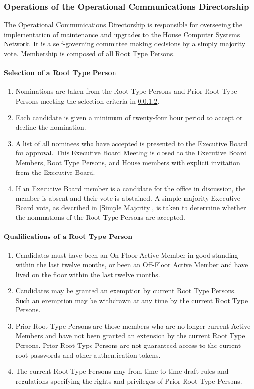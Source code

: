 \documentclass{article}
\newcommand{\asubsection}[1]{\subsubsection{#1} \label{#1}}
\newcommand{\asubsubsection}[1]{\paragraph{#1} \label{#1}}
\begin{document}
\asubsection{Operations of the Operational Communications Directorship}
The Operational Communications Directorship is responsible for overseeing the implementation of maintenance and upgrades to the House Computer Systems Network.
It is a self-governing committee making decisions by a simply majority vote.
Membership is composed of all Root Type Persons.

\asubsubsection{Selection of a Root Type Person}
\renewcommand{\theenumi}{\alph{enumi}} %
\begin{enumerate}
	\item Nominations are taken from the Root Type Persons and Prior Root Type Persons meeting the selection criteria in \ref{Qualifications of a Root Type Person}.
	\item Each candidate is given a minimum of twenty-four hour period to accept or decline the nomination.
	\item A list of all nominees who have accepted is presented to the Executive Board for approval.
		This Executive Board Meeting is closed to the Executive Board Members, Root Type Persons, and House members with explicit invitation from the Executive Board.
	\item If an Executive Board member is a candidate for the office in discussion, the member is absent and their vote is abstained.
		A simple majority Executive Board vote, as described in \ref{Simple Majority}, is taken to determine whether the nominations of the Root Type Persons are accepted.
\end{enumerate}

\asubsubsection{Qualifications of a Root Type Person}
\renewcommand{\theenumi}{\alph{enumi}} %
\begin{enumerate}
	\item Candidates must have been an On-Floor Active Member in good standing within the last twelve months, or been an Off-Floor Active Member and have lived on the floor within the last twelve months.
	\item Candidates may be granted an exemption by current Root Type Persons.
		Such an exemption may be withdrawn at any time by the current Root Type Persons.
	\item Prior Root Type Persons are those members who are no longer current Active Members and have not been granted an extension by the current Root Type Persons.
		Prior Root Type Persons are not guaranteed access to the current root passwords and other authentication tokens.
	\item The current Root Type Persons may from time to time draft rules and regulations specifying the rights and privileges of Prior Root Type Persons.
\end{enumerate}
\end{document}
